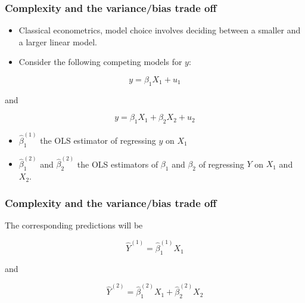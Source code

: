 \documentclass[
  shownotes,
  xcolor={svgnames},
  hyperref={colorlinks,citecolor=DarkBlue,linkcolor=DarkRed,urlcolor=DarkBlue}
  , aspectratio=169]{beamer}
\begin{document}
\begin{frame}
\frametitle{Complexity and the variance/bias trade off}

\begin{itemize}
\item Classical econometrics, model choice involves deciding between a smaller and a larger linear model. 
\item Consider the following competing models for $y$:

\end{itemize}
\bigskip
\begin{equation}
y=\beta_1 X_1 + u_1
\end{equation}

and

\begin{equation}
y=\beta_1 X_1 + \beta_2 X_2 + u_2
\end{equation}

\bigskip
\begin{itemize}
  \item $\hat \beta^{(1)}_1$ the OLS estimator of regressing $y$ on $X_1$
  \item  $\hat \beta^{(2)}_1$ and $\hat \beta^{(2)}_2$ the OLS estimators of $\beta_1$ and $\beta_2$ of regressing $Y$ on $X_1$ and $X_2$. 
\end{itemize}
 
\end{frame}

\begin{frame}
\frametitle{Complexity and the variance/bias trade off}

The corresponding predictions will be

\begin{equation}\label{eq:3_2_3}
\hat{Y}^{(1)}=\hat{\beta}^{(1)}_1 X_1 
\end{equation}

and

\begin{equation}\label{eq:3_2_4}
\hat{Y}^{(2)}=\hat{\beta}^{(2)}_1 X_1 + \hat{\beta}^{(2)}_2 X_2 
\end{equation}

\end{frame}
\end{document}
